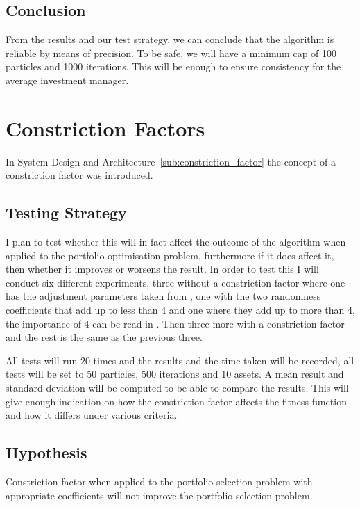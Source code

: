 \documentclass{pdfmx4020}
\begin{document}
    \subsection{Conclusion} %
    \label{sub:conclusion}
    From the results and our test strategy, we can conclude that the algorithm is reliable by means of precision. To be safe, we will have a minimum cap of 100 particles and 1000 iterations. This will be enough to ensure consistency for the average investment manager.       

  \section{Constriction Factors} %
  \label{sec:constriction_factors}
  In System Design and Architecture~\ref{sub:constriction_factor} the concept of a constriction factor was introduced. 
    
    \subsection{Testing Strategy} %
    \label{sub:testing_strategy}
      I plan to test whether this will in fact affect the outcome of the algorithm when applied to the portfolio optimisation problem, furthermore if it does affect it, then whether it improves or worsens the result. In order to test this I will conduct six different experiments, three without a constriction factor where one has the adjustment parameters taken from \cite{constriction_factor_3}, one with the two randomness coefficients that add up to less than 4 and one where they add up to more than 4, the importance of 4 can be read in \cite{constriction_factor}. Then three more with a constriction factor and the rest is the same as the previous three.

      All tests will run 20 times and the results and the time taken will be recorded, all tests will be set to 50 particles, 500 iterations and 10 assets. A mean result and standard deviation will be computed to be able to compare the results. This will give enough indication on how the constriction factor affects the fitness function and how it differs under various criteria.  

    \subsection{Hypothesis} %
    \label{sub:hypothesis}
      Constriction factor when applied to the portfolio selection problem with appropriate coefficients will not improve the portfolio selection problem.
\end{document}
